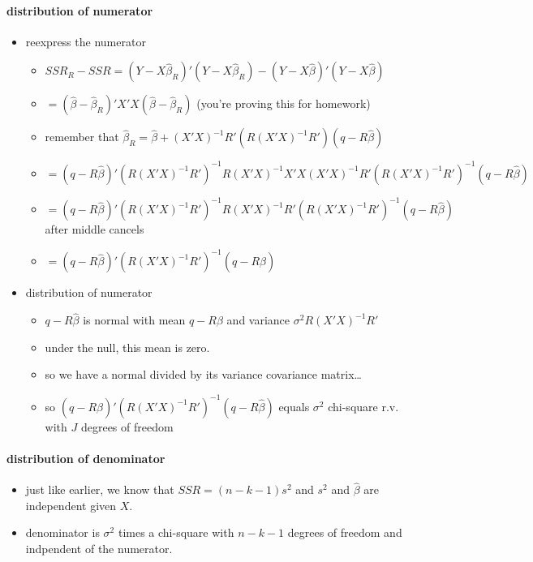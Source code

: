 \paragraph{distribution of numerator}
\begin{itemize}
\item reexpress the numerator
\begin{itemize}
\item $SSR_R - SSR = (Y - X\hat\beta_R)'(Y - X\hat\beta_R) - (Y -
             X\hat\beta)'(Y - X\hat\beta)$
\item $= (\hat\beta - \hat\beta_R)'X'X(\hat\beta - \hat\beta_R)$
             (you're proving this for homework)
\item remember that $\hat\beta_R = \hat\beta + (X'X)^{-1}
             R'(R(X'X)^{-1}R')(q - R\hat\beta)$
\item $= (q -
             R\hat\beta)'(R(X'X)^{-1}R')^{-1}R(X'X)^{-1}X'X(X'X)^{-1}R'(R(X'X)^{-1}R')^{-1}
             (q - R\hat\beta)$
\item $= (q -
             R\hat\beta)'(R(X'X)^{-1}R')^{-1}R(X'X)^{-1} R'(R(X'X)^{-1}R')^{-1}
             (q - R\hat\beta)$ after middle cancels
\item $= (q -
             R\hat\beta)'(R(X'X)^{-1}R')^{-1}(q - R\hat\beta)$
\end{itemize}
\item distribution of numerator
\begin{itemize}
\item $q - R\hat\beta$ is normal with mean $q - R\beta$ and
             variance $\sigma^2 R(X'X)^{-1}R'$
\item under the null, this mean is zero.
\item so we have a normal divided by its variance covariance matrix\ldots{}
\item so $(q - R\hat\beta)'(R(X'X)^{-1}R')^{-1}(q - R\hat\beta)$
             equals $\sigma^2$ chi-square r.v. with $J$ degrees of freedom
\end{itemize}
\end{itemize}

\paragraph{distribution of denominator}
\begin{itemize}
\item just like earlier, we know that $SSR = (n-k-1) s^2$ and $s^2$
         and $\hat \beta$ are independent given $X$.
\item denominator is $\sigma^2$ times a chi-square with $n-k-1$
         degrees of freedom and indpendent of the numerator.
\end{itemize}

